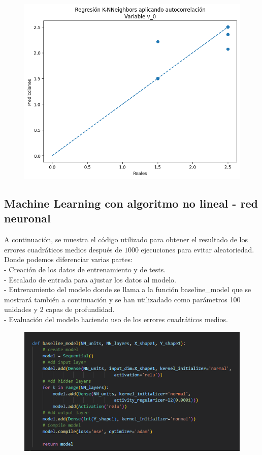 \documentclass[oneside,openright,titlepage,numbers=noenddot,openany,headinclude,footinclude=true,
cleardoublepage=empty,abstractoff,BCOR=5mm,paper=a4,fontsize=12pt,main=spanish]{scrreprt}
\begin{document}
\begin{figure}[H]
	\centering
	\includegraphics[width=12cm]{Regresión K-NNeighbors aplicando autocorrelación Variable v_0.png}
\end{figure}

\subsection{Machine Learning con algoritmo no lineal - red neuronal}

A continuación, se muestra el código utilizado para obtener el resultado de los errores cuadráticos medios después de $1000$ ejecuciones para evitar aleatoriedad. Donde podemos diferenciar varias partes:\\
- Creación de los datos de entrenamiento y de tests.\\
- Escalado de entrada para ajustar los datos al modelo.\\
- Entrenamiento del modelo donde se llama a la función baseline\_model que se mostrará también a continuación y se han utilizadado como parámetros 100 unidades y 2 capas de profundidad.\\
- Evaluación del modelo haciendo uso de los errores cuadráticos medios.

\begin{figure}[H]
	\centering
	\includegraphics[width=15cm]{Código Red Neuronal función.png}
\end{figure}
\end{document}
